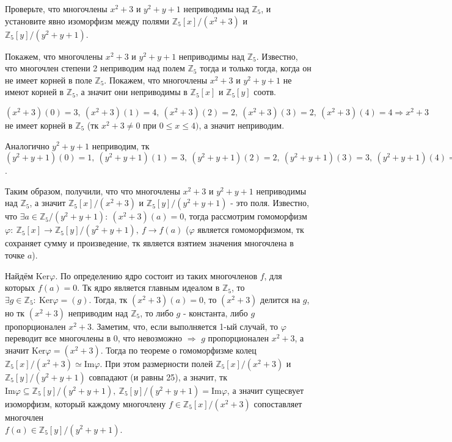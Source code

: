 \documentclass[a4paper, 16pt]{article}
\newcommand{\Z} {\mathbb{Z}}
\newenvironment{solution}[1][Решение]{%
	\begin{trivlist}
		\item[\hskip \labelsep {\bfseries #1:}]
		\item \hspace{15pt}
	}{
	\end{trivlist}
}
\begin{document}
		Проверьте, что многочлены $x^2 + 3$ и $y^2 + y + 1$ неприводимы над $\Z_5$, и установите явно изоморфизм между полями $\Z_5[x]/(x^2 + 3)$ и $\Z_5[y] / (y^2 + y+1)$.
		
		\begin{solution}
			Покажем, что многочлены $x^2 + 3$ и $y^2 + y + 1$ неприводимы над $\Z_5$. Известно, что многочлен степени 2 неприводим над полем $\Z_5$ тогда и только тогда, когда он
			не имеет корней в поле $\Z_5$. Покажем, что многочлены $x^2 + 3$ и $y^2 + y + 1$ не имеют корней в $\Z_5$, а значит они неприводимы в $\Z_5[x]$ и $\Z_5[y]$ соотв.
			
			  $(x^2 + 3)(0) = 3, \ (x^2 + 3)(1) = 4, \ (x^2 + 3)(2) = 2, \
			  (x^2 + 3)(3) = 2,\ (x^2 + 3)(4) = 4 \Rightarrow x^2 + 3$ не имеет корней в $\Z_5$ (тк $x^2 + 3 \ne 0$ при $0 \leq x \leq 4 )$, а значит неприводим.  
			  
			  Аналогично $y^2 + y + 1$ неприводим, тк 
			  $(y^2 + y + 1)(0) = 1, \ (y^2 + y + 1)(1) = 3, \ (y^2 + y + 1)(2) = 2, \
			  (y^2 + y + 1)(3) = 3, \ (y^2 + y + 1)(4) = 1$.
			  
			  Таким образом, получили, что что многочлены $x^2 + 3$ и $y^2 + y + 1$ неприводимы над $\Z_5$, а значит $\Z_5[x]/(x^2 + 3)$ и $\Z_5[y] / (y^2 + y+1)$ - это поля. Известно, что
			  $\exists a \in \Z_5 / (y^2 + y+1): \ (x^2 + 3)(a) = 0$, тогда рассмотрим гомоморфизм $\varphi : \ \Z_5[x] \to \Z_5[y] / (y^2 + y+1), \ f \to f(a)$ ($\varphi$ является гомоморфизмом, тк сохраняет сумму и произведение, тк является взятием значения многочлена в точке $a$). 
			  
			  Найдём $\text{Ker}\varphi$. По определению ядро состоит из таких многочленов $f$, для которых $f(a) = 0$. Тк ядро является главным идеалом в $\Z_5$, то $\exists g\in \Z_5: \
			  \text{Ker}\varphi = (g)$. Тогда, тк $ (x^2 + 3)(a) = 0$, то $ (x^2 + 3)$ делится на $g$, но тк $ (x^2 + 3)$ неприводим над $\Z_5$, то либо $g$ - константа, либо $g$ пропорционален $ x^2 + 3$. Заметим, что, если выполняется 1-ый случай, то $\varphi$ переводит все многочлены в 0, что невозможно $\Rightarrow$ $g$ пропорционален $ x^2 + 3$, а значит 
			  $\text{Ker}\varphi = (x^2 + 3)$. Тогда по теореме о гомоморфизме колец $\Z_5[x]/(x^2 + 3) \simeq \text{Im}\varphi$. При этом размерности полей $\Z_5[x]/(x^2 + 3)$ и $\Z_5[y] / (y^2 + y+1)$ совпадают (и равны 25), а значит, тк $\text{Im}\varphi \subseteq \Z_5[y] / (y^2 + y+1), \ 
			  \Z_5[y] / (y^2 + y+1) = \text{Im}\varphi$, а значит сущесвует изоморфизм, который каждому многочлену $f \in \Z_5[x]/(x^2 + 3)$ сопоставляет многочлен \\ $f(a) \in \Z_5[y] / (y^2 + y+1)$.
			  

\end{solution}
\end{document}
